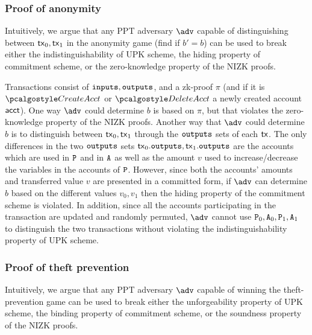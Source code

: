 
\subsubsection{Proof of anonymity}
Intuitively, we argue that any PPT adversary $\adv$ capable of distinguishing between $\textup{\textsf{tx}}_0, \textup{\textsf{tx}}_1$ in the anonymity game (find if $b'=b$) can be used to break either the indistinguishability of UPK scheme, the hiding property of commitment scheme, or the zero-knowledge property of the NIZK proofs. 

Transactions consist of ${\textup{\texttt{inputs}}}, {\textup{\texttt{outputs}}}$, and a zk-proof $\pi$ (and if it is $\createAcct$ or $\deleteAcct$ a newly created account $\textup{\textsf{acct}}$). One way $\adv$ could determine $b$ is based  on $\pi$, but that violates the zero-knowledge property of the NIZK proofs. 
Another way that $\adv$ could determine $b$ is to distinguish between $\textup{\textsf{tx}}_0, \textup{\textsf{tx}}_1$ through the ${\textup{\texttt{outputs}}}$ sets of each $\textup{\textsf{tx}}$. The only differences in the two  ${\textup{\texttt{outputs}}}$ sets $\textup{\textsf{tx}}_0.{{\textup{\texttt{outputs}}}}, \textup{\textsf{tx}}_1.{{\textup{\texttt{outputs}}}}$ are the accounts which are used in $\mathtt{P}$ and in ${\mathtt{A}}$ as well as the amount $v$ used to increase/decrease the variables in the accounts of $\mathtt{P}$.
However, since both the accounts' amounts and transferred value $v$ are presented in a committed form, if $\adv$ can determine $b$ based on the different values $v_0, v_1$ then the hiding property of the commitment scheme is violated.
In addition, since all the accounts participating in the transaction are updated and randomly permuted, 
 $\adv$ cannot use $\mathtt{P}_0, {\mathtt{A}}_0,\mathtt{P}_1, {\mathtt{A}}_1$ to distinguish the two transactions without violating the indistinguishability property of UPK scheme.

 

\subsubsection{Proof of theft prevention}
Intuitively, we argue that any PPT adversary $\adv$ capable of winning the theft-prevention game can be used to break either the unforgeability property of UPK scheme, the binding property of commitment scheme, or the soundness property of the NIZK proofs.

